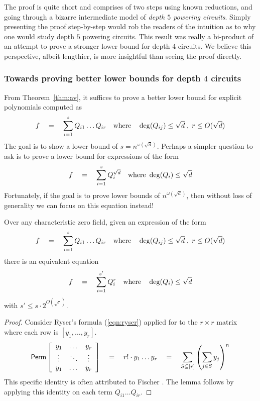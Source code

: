 \documentclass[12pt]{report}
\begin{document}
The proof is quite short and comprises of two steps using known reductions, and going through a bizarre intermediate model of \emph{depth $5$ powering circuits}. Simply presenting the proof step-by-step would rob the readers of the intuition as to why one would study depth $5$ powering circuits. This result was really a bi-product of an attempt to prove a stronger lower bound for depth $4$ circuits. We believe this perspective, albeit lengthier, is more insightful than seeing the proof directly. 

\subsubsection{Towards proving better lower bounds for depth $4$ circuits}

From Theorem~\ref{thm:av}, it suffices to prove a better lower bound for explicit polynomials computed as
\begin{equation}\label{eqn:d4-LB}
f\quad = \quad \sum_{i=1}^s Q_{i1}\dots Q_{ir} \quad\text{where}\quad \deg(Q_{ij})\leq \sqrt{d}\;,\; r\leq O(\sqrt{d})
\end{equation}
The goal is to show a lower bound of $s = n^{\omega(\sqrt{d})}$. Perhaps a simpler question to ask is to prove a lower bound for expressions of the form
\begin{equation}\label{eqn:d4pow-LB}
f\quad = \quad \sum_{i=1}^s Q_{i}^{\sqrt{d}} \quad\text{where }\deg(Q_i)\leq \sqrt{d}
\end{equation}
Fortunately, if the goal is to prove lower bounds of $n^{\omega(\sqrt{d})}$, then without loss of generality we can focus on this equation instead! 

\begin{lemma}\label{lem:fischer}
Over any characteristic zero field, given an expression of the form 
\[
f\quad = \quad \sum_{i=1}^s Q_{i1}\dots Q_{ir} \quad\text{where}\quad \deg(Q_{ij})\leq \sqrt{d}\;,\; r\leq O(\sqrt{d})
\]
there is an equivalent equation
\[
f\quad = \quad \sum_{i=1}^{s'} Q_{i}^r\quad\text{where}\quad \deg(Q_{i})\leq \sqrt{d}
\]
with $s' \leq s \cdot 2^{O(\sqrt{r})}$. 
\end{lemma}
\begin{proof}
Consider Ryser's formula (\ref{eqn:ryser}) applied for to the $r\times r$ matrix where each row is $[y_1,\dots, y_r]$. 
\[
\mathsf{Perm} \left[\begin{array}{ccc} y_1 & \dots & y_r\\ \vdots & \ddots & \vdots \\ y_1 & \dots & y_r\end{array}\right] \quad = \quad r! \cdot y_1\dots y_r \quad = \quad \sum_{S\subseteq [r]} \left(\sum_{j\in S} y_j\right)^n
\]
This specific identity is often attributed to Fischer \cite{fischer}. The lemma follows by applying this identity on each term $Q_{i1}\dots Q_{ir}$. 
\end{proof}
\end{document}
